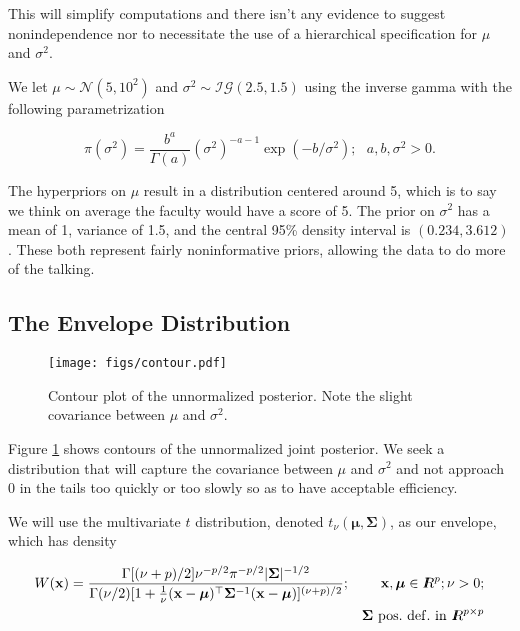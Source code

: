 \documentclass[12pt]{article}
\newcommand{\m}[1]{\mathbf{\bm{#1}}}
\newcommand{\R}{I\hspace{-4.4pt}R}
\begin{document}
\noindent This will simplify computations and there isn't any evidence to suggest nonindependence nor to necessitate the use of a hierarchical specification for $\mu$ and $\sigma^2$.
\bigskip

\noindent We let $\mu\sim\mathcal{N}(5, 10^2)$ and $\sigma^2\sim\mathcal{IG}(2.5, 1.5)$ using the inverse gamma with the following parametrization

\[ \pi(\sigma^2) = \frac{b^a}{\Gamma(a)}(\sigma^2)^{-a-1}\exp(-b/\sigma^2);~~~ a,b,\sigma^2>0. \]

\noindent The hyperpriors on $\mu$ result in a distribution centered around 5, which is to say we think on average the faculty would have a score of 5. The prior on $\sigma^2$ has a mean of 1, variance of 1.5, and the central 95\% density interval is $(0.234, 3.612)$. These both represent fairly noninformative priors, allowing the data to do more of the talking.

\subsection{The Envelope Distribution}

\begin{figure}
    \begin{center}
    \texttt{[image: figs/contour.pdf]}
    \end{center}
    \caption{Contour plot of the unnormalized posterior. Note the slight covariance between $\mu$ and $\sigma^2$.}
    \label{contour}
\end{figure}


\noindent Figure \ref{contour} shows contours of the unnormalized joint posterior. We seek a distribution that will capture the covariance between $\mu$ and $\sigma^2$ and not approach $0$ in the tails too quickly or too slowly so as to have acceptable efficiency.
\bigskip

\noindent We will use the multivariate $t$ distribution, denoted $t_\nu(\m{\mu}, \m{\Sigma})$, as our envelope, which has density

\begin{eqnarray*}
W(\m{x}) = \frac{\Gamma[(\nu+p)/2]\nu^{-p/2}\pi^{-p/2}|\m{\Sigma}|^{-1/2}}{\Gamma(\nu/2)[1+\frac{1}{\nu}(\m{x}-\m{\mu})^\top\m{\Sigma}^{-1}(\m{x}-\m{\mu})]^{(\nu+p)/2}}; && \m{x}, \m{\mu} \in \R^p; \nu>0; \\
&& \m{\Sigma}~\mathrm{pos.~def.~in~} \R^{p\times p}\\
\end{eqnarray*}
\end{document}
